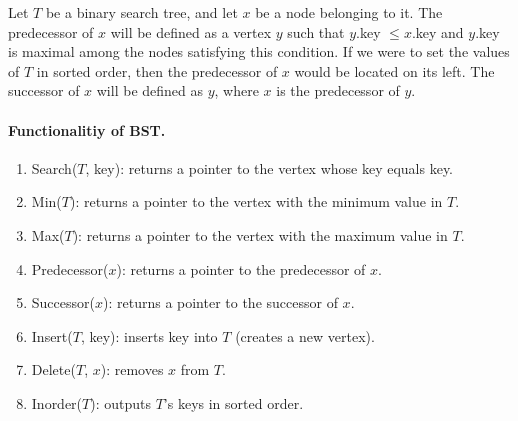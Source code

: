 \begin{definition}
Let $T$ be a binary search tree, and let $x$ be a node belonging to it. The predecessor of $x$ will be defined as a vertex $y$ such that $y$.key $\leq x$.key and $y$.key is maximal among the nodes satisfying this condition. If we were to set the values of $T$ in sorted order, then the predecessor of $x$ would be located on its left. The successor of $x$ will be defined as $y$, where $x$ is the predecessor of $y$.
\end{definition}

\paragraph{Functionalitiy of BST.}
\begin{enumerate}
\item Search($T$, key): returns a pointer to the vertex whose key equals key. 
  \item Min($T$): returns a pointer to the vertex with the minimum value in $T$.  
  \item Max($T$): returns a pointer to the vertex with the maximum value in $T$.  
  \item Predecessor($x$): returns a pointer to the predecessor of $x$.  
  \item Successor($x$): returns a pointer to the successor of $x$. 
  \item Insert($T$, key): inserts key into $T$ (creates a new vertex).   
  \item Delete($T$, $x$): removes $x$ from $T$. 
  \item Inorder($T$): outputs $T$'s keys in sorted order.

\end{enumerate}

\begin{algorithm}
\SetAlgoLined
{}
\end{algorithm}

